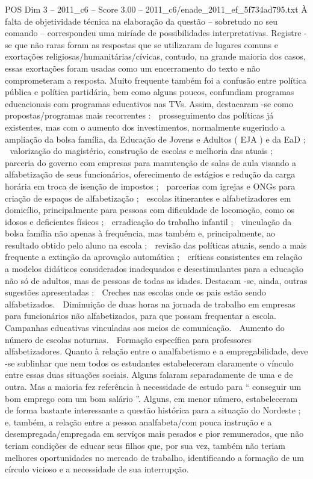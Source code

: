 \begin{textsample}{POS Dim 3 – 2011\_c6 – Score 3.00 – 2011\_c6/enade\_2011\_ef\_5f734ad795.txt}
À falta de objetividade técnica na elaboração da questão – sobretudo no seu comando – correspondeu uma miríade de possibilidades interpretativas.
Registre -se que não raras foram as respostas que se utilizaram de lugares comuns e exortações religiosas/humanitárias/cívicas, contudo, na grande maioria dos casos, essas exortações foram usadas como um encerramento do texto e não comprometeram a resposta.
Muito frequente também foi a confusão entre política pública e política partidária, bem como alguns poucos, confundiam programas educacionais com programas educativos nas TVs.
Assim, destacaram -se como propostas/programas mais recorrentes :  prosseguimento das políticas já existentes, mas com o aumento dos investimentos, normalmente sugerindo a ampliação da bolsa família, da Educação de Jovens e Adultos ( EJA ) e da EaD ;  valorização do magistério, construção de escolas e melhoria das atuais ;  parceria do governo com empresas para manutenção de salas de aula visando a alfabetização de seus funcionários, oferecimento de estágios e redução da carga horária em troca de isenção de impostos ;  parcerias com igrejas e ONGs para criação de espaços de alfabetização ;  escolas itinerantes e alfabetizadores em domicílio, principalmente para pessoas com dificuldade de locomoção, como os idosos e deficientes físicos ;  erradicação do trabalho infantil ;  vinculação da bolsa família não apenas à frequência, mas também e, principalmente, ao resultado obtido pelo aluno na escola ;  revisão das políticas atuais, sendo a mais frequente a extinção da aprovação automática ;  críticas consistentes em relação a modelos didáticos considerados inadequados e desestimulantes para a educação não só de adultos, mas de pessoas de todas as idades.
Destacam -se, ainda, outras sugestões apresentadas :  Creches nas escolas onde os pais estão sendo alfabetizados.  Diminuição de duas horas na jornada de trabalho em empresas para funcionários não alfabetizados, para que possam frequentar a escola.  Campanhas educativas vinculadas aos meios de comunicação.  Aumento do número de escolas noturnas.  Formação específica para professores alfabetizadores.
Quanto à relação entre o analfabetismo e a empregabilidade, deve -se sublinhar que nem todos os estudantes estabeleceram claramente o vínculo entre essas duas situações sociais.
Alguns falaram separadamente de uma e de outra.
Mas a maioria fez referência à necessidade de estudo para “ conseguir um bom emprego com um bom salário ”.
Alguns, em menor número, estabeleceram de forma bastante interessante a questão histórica para a situação do Nordeste ; e, também, a relação entre a pessoa analfabeta/com pouca instrução e a desempregada/empregada em serviços mais pesados e pior remunerados, que não teriam condições de educar seus filhos que, por sua vez, também não teriam melhores oportunidades no mercado de trabalho, identificando a formação de um círculo vicioso e a necessidade de sua interrupção.

\end{textsample}
